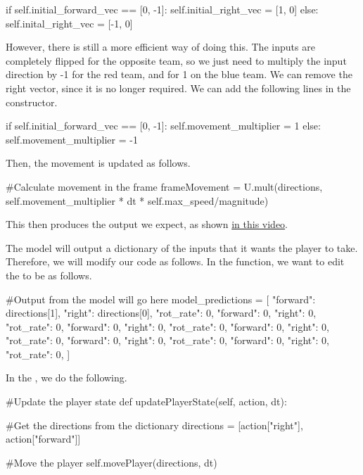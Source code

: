 \begin{mpy}
        if self.initial_forward_vec == [0, -1]:
            self.initial_right_vec = [1, 0]
        else:
            self.inital_right_vec = [-1, 0]
\end{mpy}

However, there is still a more efficient way of doing this. The inputs are completely flipped for the opposite team, so we just need to multiply the input direction by -1 for the red team, and for 1 on the blue team. We can remove the right vector, since it is no longer required. We can add the following lines in the constructor.

\begin{mpy}
        if self.initial_forward_vec == [0, -1]:
            self.movement_multiplier = 1
        else:
            self.movement_multiplier = -1
\end{mpy}

Then, the movement is updated as follows.

\begin{mpy}
        #Calculate movement in the frame
        frameMovement = U.mult(directions, self.movement_multiplier * dt * self.max_speed/magnitude)
\end{mpy}

This then produces the output we expect, as shown \href{https://youtu.be/ZixPY08tVlE}{in this video}.
\vs

The model will output a dictionary of the inputs that it wants the player to take. Therefore, we will modify our code as follows. In the  function, we want to edit the  to be as follows.

\begin{mpy}
            #Output from the model will go here
            model_predictions = [
                {"forward": directions[1], "right": directions[0], "rot_rate": 0},
                {"forward": 0, "right": 0, "rot_rate": 0},
                {"forward": 0, "right": 0, "rot_rate": 0},
                {"forward": 0, "right": 0, "rot_rate": 0},
                {"forward": 0, "right": 0, "rot_rate": 0},
                {"forward": 0, "right": 0, "rot_rate": 0},
            ]
\end{mpy}

In the , we do the following.

\begin{mpy}
    #Update the player state
    def updatePlayerState(self, action, dt):

        #Get the directions from the dictionary
        directions = [action["right"], action["forward"]]

        #Move the player
        self.movePlayer(directions, dt)
\end{mpy}

